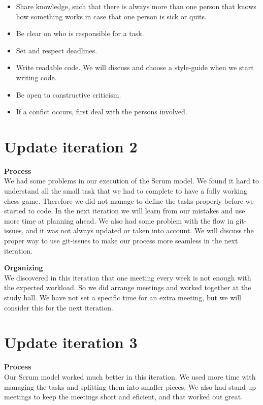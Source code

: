 \documentclass[norsk]{article}
\begin{document}
  \begin{itemize}
  	\item 
  	Share knowledge, such that there is always more than one person that knows how something works in case that one person is sick or quits.
  	\item 
  	Be clear on who is responsible for a task.
  	\item 
  	Set and respect deadlines.
  	\item 
  	Write readable code. We will discuss and choose a style-guide when we start writing code. 
  	\item 
  	Be open to constructive criticism.
  	\item
  	If a confict occurs, first deal with the persons involved. 
 \end{itemize}

\section{Update iteration 2}

\textbf{Process}\\
We had some problems in our execution of the Scrum model. We found it hard to understand all the small task that we had to complete to have a fully working chess game. Therefore we did not manage to define the tasks properly before we started to code. In the next iteration we will learn from our mistakes and use more time at planning ahead. We also had some problem with the flow in git-issues, and it was not always updated or taken into account. We will discuss the proper way to use git-issues to make our process more seamless in the next iteration.

\textbf{Organizing}\\
We discovered in this iteration that one meeting every week is not enough with the expected workload. So we did arrange meetings and worked together at the study hall. We have not set a specific time for an extra meeting, but we will consider this for the next iteration.

\section{Update iteration 3}
\textbf{Process}\\
Our Scrum model worked much better in this iteration. We used more time with managing the tasks and splitting them into smaller pieces. We also had stand up meetings to keep the meetings short and eficient, and that worked out great.
\end{document}
